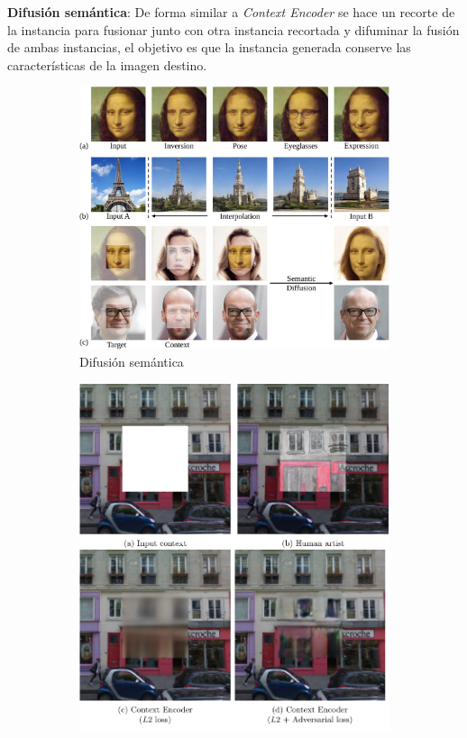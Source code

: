 \textbf{Difusión semántica}:
De forma similar a \textit{Context Encoder} se hace un recorte de la instancia para fusionar junto con otra instancia recortada y difuminar la fusión de ambas instancias, el objetivo es que la instancia generada conserve las características de la imagen destino.

\begin{figure}[H]
    \captionsetup[subfigure]{justification=centering}
    \begin{subfigure}{.60\linewidth}
        \includegraphics[width=\linewidth]{figures/chapter02/main_teaser.pdf}
        \caption{Difusión semántica}
        \label{subfig:semantic-diffusion}
    \end{subfigure} 
    \hfill
    \begin{subfigure}{.35\linewidth}
        \includegraphics[width=\linewidth]{figures/chapter02/context-encoder.pdf}

\end{subfigure}
\end{figure}

